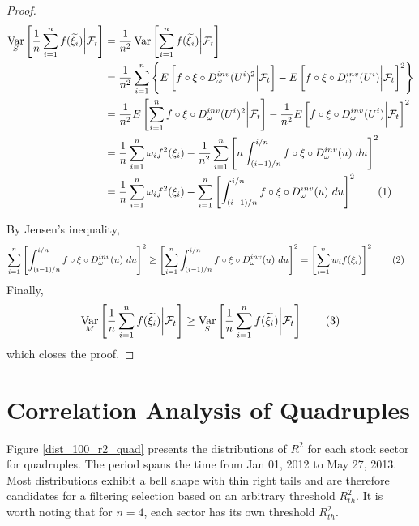 \documentclass[11pt,a4,twosided,singlespacing,titlepagenumber=on]{scrreprt}
\numberwithin{equation}{chapter} %
\theoremstyle{remark}
\DeclareMathOperator{\var}{Var}
\newcommand\numberthis{\addtocounter{equation}{1}\tag{\theequation}}
\begin{document}
\begin{proof}
\begin{align*}
\var_S \left[ \frac{1}{n} \sum_{i=1}^n f(\widetilde{\xi_i}) \bigg| \mathcal{F}_t \right] &= \frac{1}{n^2} \var \left[ \sum_{i=1}^n f(\widetilde{\xi_i}) \bigg| \mathcal{F}_t \right] \\
																					  &= \frac{1}{n^2} \sum_{i=1}^n \left\{ E \left[ f \circ \xi \circ D_\omega^{inv}(U^i)^2 \bigg| \mathcal{F}_t \right] - E \left[ f \circ \xi \circ D_\omega^{inv}(U^i) \bigg| \mathcal{F}_t \right]^2 \right\}\\
																					  &= \frac{1}{n^2} E \left[ \sum_{i=1}^n f \circ \xi \circ D_\omega^{inv}(U^i)^2 \bigg| \mathcal{F}_t \right] - \frac{1}{n^2} E \left[ f \circ \xi \circ D_\omega^{inv}(U^i) \bigg| \mathcal{F}_t \right]^2 \\
																					  &= \frac{1}{n} \sum_{i=1}^n \omega_i f^2(\xi_i) - \frac{1}{n^2} \sum_{i=1}^n \left[ n \int_{(i-1)/n}^{i/n} f \circ \xi \circ D_\omega^{inv}(u)\text{ }du\right]^2 \\
																					  &= \frac{1}{n} \sum_{i=1}^n \omega_i f^2(\xi_i) - \sum_{i=1}^n \left[ \int_{(i-1)/n}^{i/n} f \circ \xi \circ D_\omega^{inv}(u)\text{ }du\right]^2 \numberthis
\end{align*}

By Jensen's inequality,
\begin{align*}
\sum_{i=1}^n \left[ \int_{(i-1)/n}^{i/n} f \circ \xi \circ D_\omega^{inv}(u)\text{ }du\right]^2 &\geq \left[\sum_{i=1}^n \int_{(i-1)/n}^{i/n} f \circ \xi \circ D_\omega^{inv}(u)\text{ }du\right]^2 = \left[ \sum_{i=1}^n w_i f(\xi_i)\right]^2 \numberthis
\end{align*}
Finally,
\begin{equation}
\var_M \left[ \frac{1}{n} \sum_{i=1}^n f(\widetilde{\xi_i}) \bigg| \mathcal{F}_t \right] \geq \var_S \left[ \frac{1}{n} \sum_{i=1}^n f(\widetilde{\xi_i}) \bigg| \mathcal{F}_t \right] \numberthis
\end{equation}
which closes the proof.
\end{proof}

\section{Correlation Analysis of Quadruples}
\label{sec:corr_analysis_quad}
Figure \ref{dist_100_r2_quad} presents the distributions of $R^2$ for each stock sector for quadruples. The period spans the time from Jan 01, 2012 to May 27, 2013. Most distributions exhibit a bell shape with thin right tails and are therefore candidates for a filtering selection based on an arbitrary threshold $R^2_{th}$. It is worth noting that for $n=4$, each sector has its own threshold $R^2_{th}$.
\end{document}
